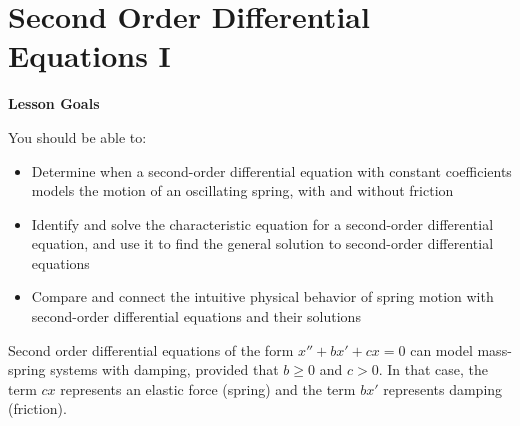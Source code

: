 \documentclass[main]{subfiles}
\begin{document}
\ifSubfilesClassLoaded{%
  \chaptermark{\chapterthree}
}{}

\section{Second Order Differential Equations I} \label{ws3-6}

\begin{framed}
\centerline{\textbf{Lesson Goals}}

You should be able to:
\begin{itemize}
\item Determine when a second-order differential equation with constant coefficients models the motion of an oscillating spring, with and without friction
\item Identify and solve the characteristic equation for a second-order differential equation, and use it to find the general solution to second-order differential equations
\item Compare and connect the intuitive physical behavior of spring motion with second-order differential equations and their solutions
\end{itemize}
\end{framed}

\begin{framed}
Second order differential equations of the form $x'' + bx' +cx = 0$ can model mass-spring systems with damping, provided that $b \geq 0$ and $c > 0$. In that case, the term $cx$ represents an elastic force (spring) and the term $bx'$ represents damping (friction).
\end{framed}
\end{document}
